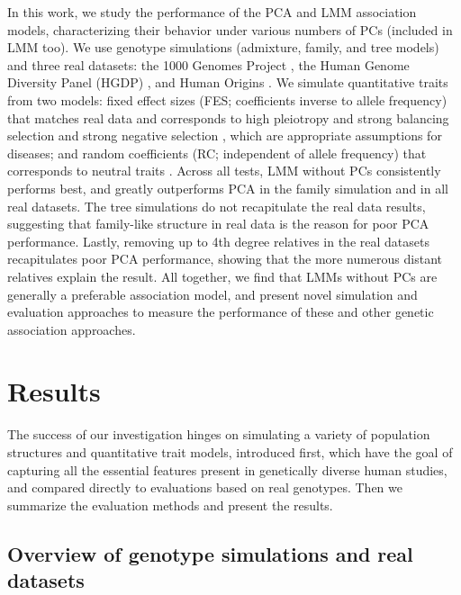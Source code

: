 \documentclass[11pt]{article}
\begin{document}
In this work, we study the performance of the PCA and LMM association models, characterizing their behavior under various numbers of PCs (included in LMM too).
We use genotype simulations (admixture, family, and tree models) and three real datasets: the 1000 Genomes Project \citep{the_1000_genomes_project_consortium_map_2010, 1000_genomes_project_consortium_integrated_2012}, the Human Genome Diversity Panel (HGDP) \citep{cann_human_2002, rosenberg_genetic_2002, bergstrom_insights_2020}, and Human Origins \citep{patterson_ancient_2012, lazaridis_ancient_2014, lazaridis_genomic_2016, skoglund_genomic_2016}.
We simulate quantitative traits from two models: fixed effect sizes (FES; coefficients inverse to allele frequency) that matches real data \citep{park_distribution_2011, zeng_signatures_2018, oconnor_extreme_2019} and corresponds to high pleiotropy and strong balancing selection \citep{simons_population_2018} and strong negative selection \citep{zeng_signatures_2018, oconnor_extreme_2019}, which are appropriate assumptions for diseases; and random coefficients (RC; independent of allele frequency) that corresponds to neutral traits \citep{zeng_signatures_2018, simons_population_2018}.
Across all tests, LMM without PCs consistently performs best, and greatly outperforms PCA in the family simulation and in all real datasets.
The tree simulations do not recapitulate the real data results, suggesting that family-like structure in real data is the reason for poor PCA performance.
Lastly, removing up to 4th degree relatives in the real datasets recapitulates poor PCA performance, showing that the more numerous distant relatives explain the result.
All together, we find that LMMs without PCs are generally a preferable association model, and present novel simulation and evaluation approaches to measure the performance of these and other genetic association approaches.

\section{Results}

The success of our investigation hinges on simulating a variety of population structures and quantitative trait models, introduced first, which have the goal of capturing all the essential features present in genetically diverse human studies, and compared directly to evaluations based on real genotypes.
Then we summarize the evaluation methods and present the results.

\subsection{Overview of genotype simulations and real datasets}
\end{document}
